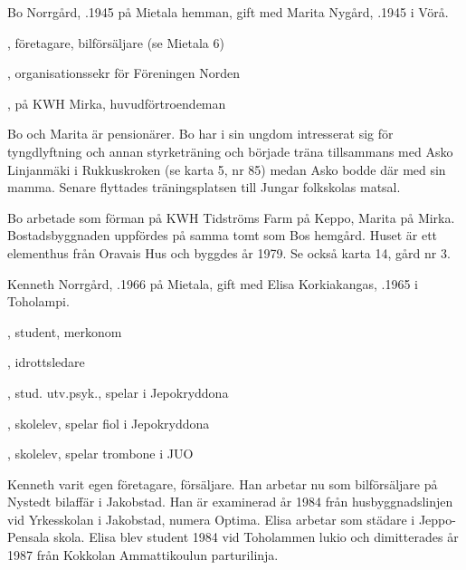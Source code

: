 


Bo Norrgård, .1945  på Mietala hemman, gift med Marita Nygård, .1945 i Vörå.
\begin{jhchildren}
  \item {}, företagare, bilförsäljare (se Mietala 6)
  \item {}, organisationssekr för Föreningen Norden
  \item {}, på KWH Mirka, huvudförtroendeman
\end{jhchildren}

Bo och Marita är pensionärer. Bo har i sin ungdom intresserat sig för tyngdlyftning och annan styrketräning och började träna tillsammans med Asko Linjanmäki i Rukkuskroken (se karta 5, nr 85) medan Asko bodde där med sin mamma. Senare flyttades träningsplatsen till Jungar folkskolas matsal.

Bo arbetade som förman på KWH Tidströms Farm på Keppo, Marita på Mirka. Bostadsbyggnaden uppfördes på samma tomt som Bos hemgård. Huset är ett elementhus från Oravais Hus och byggdes år 1979. Se också karta 14, gård nr 3.






Kenneth Norrgård, .1966 på Mietala, gift med Elisa Korkiakangas, .1965 i Toholampi.
\begin{jhchildren}
  \item {}, student, merkonom
  \item {}, idrottsledare
  \item {}, stud. utv.psyk., spelar i Jepokryddona
  \item {}, skolelev, spelar fiol i Jepokryddona
  \item {}, skolelev, spelar trombone i JUO
\end{jhchildren}

Kenneth varit egen företagare, försäljare. Han arbetar nu som bilförsäljare på Nystedt bilaffär i Jakobstad. Han är examinerad år 1984 från husbyggnadslinjen vid Yrkesskolan i Jakobstad, numera Optima. Elisa arbetar som städare i Jeppo-Pensala skola. Elisa blev student 1984 vid Toholammen lukio och dimitterades år 1987 från Kokkolan Ammattikoulun parturilinja.

